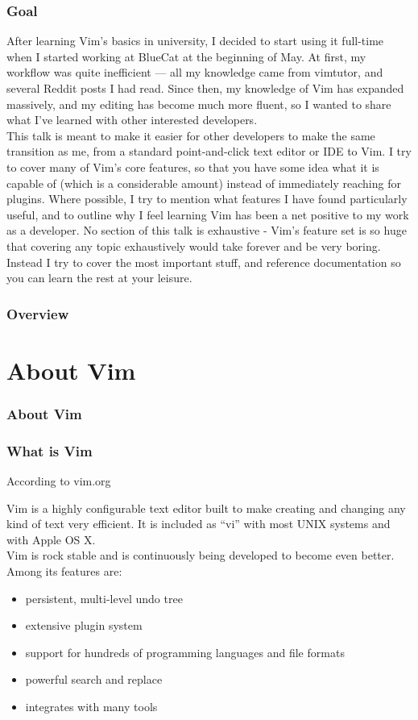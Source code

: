 \documentclass{beamer}
\begin{document}
\begin{frame}[fragile]
    \frametitle{Goal}
    \small
    After learning Vim's basics in university, I decided to start using it full-time when I started working at BlueCat at the beginning of May. At first, my workflow was quite inefficient --- all my knowledge came from vimtutor, and several Reddit posts I had read. Since then, my knowledge of Vim has expanded massively, and my editing has become much more fluent, so I wanted to share what I've learned with other interested developers.\\
    \vspace{0.5cm}
    This talk is meant to make it easier for other developers to make the same transition as me, from a standard point-and-click text editor or IDE to Vim. I try to cover many of Vim's core features, so that you have some idea what it is capable of (which is a considerable amount) instead of immediately reaching for plugins. Where possible, I try to mention what features I have found particularly useful, and to outline why I feel learning Vim has been a net positive to my work as a developer. No section of this talk is exhaustive - Vim's feature set is so huge that covering any topic exhaustively would take forever and be very boring. Instead I try to cover the most important stuff, and reference documentation so you can learn the rest at your leisure.
\end{frame}

\begin{frame}[fragile]
    \frametitle{Overview}
    \tableofcontents
\end{frame}

\section{About Vim}

\begin{frame}[fragile]
    \frametitle{About Vim}
    \tableofcontents[currentsection]
\end{frame}

\begin{frame}[fragile]
    \frametitle{What is Vim}
    \centerline{\large According to vim.org}
    \vspace{0.5cm}
    \small Vim is a highly configurable text editor built to make creating and changing any kind of text very efficient. It is included as \enquote{vi} with most UNIX systems and with Apple OS X.\\
    \vspace{0.5cm}
    Vim is rock stable and is continuously being developed to become even better. Among its features are:\\
    \begin{itemize}
	\item persistent, multi-level undo tree
	\item extensive plugin system
	\item support for hundreds of programming languages and file formats
	\item powerful search and replace
	\item integrates with many tools
    \end{itemize}
\end{frame}
\end{document}
